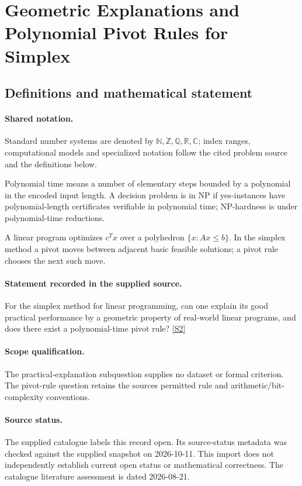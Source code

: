 \documentclass[11pt]{article}
\newcommand{\sref}[2]{\hyperlink{source:#1:#2}{[S#2]}}
\begin{document}
\section{Geometric Explanations and Polynomial Pivot Rules for Simplex}\label{statement}

\subsection{Definitions and mathematical statement}

\paragraph{Shared notation.}Standard number systems are denoted by $\mathbb N,\mathbb Z,\mathbb Q,\mathbb R,\mathbb C$; index ranges, computational models and specialized notation follow the cited problem source and the definitions below.


Polynomial time means a number of elementary steps bounded by a polynomial in the encoded input length. A decision problem is in $\mathrm{NP}$ if yes-instances have polynomial-length certificates verifiable in polynomial time; NP-hardness is under polynomial-time reductions.

A linear program optimizes $c^Tx$ over a polyhedron $\{x:Ax\leq b\}$. In the simplex method a pivot moves between adjacent basic feasible solutions; a pivot rule chooses the next such move.
\paragraph{Statement recorded in the supplied source.}
For the simplex method for linear programming, can one explain its good practical performance by a geometric property of real-world linear programs, and does there exist a polynomial-time pivot rule? \sref{statement}{2}
\paragraph{Scope qualification.}
The practical-explanation subquestion supplies no dataset or formal criterion. The pivot-rule question retains the source\textquotesingle s permitted rule and arithmetic/bit-complexity conventions.
\paragraph{Source status.}
The supplied catalogue labels this record open. Its source-status metadata was checked against the supplied snapshot on 2026-10-11. This import does not independently establish current open status or mathematical correctness. The catalogue literature assessment is dated 2026-08-21.
\end{document}
